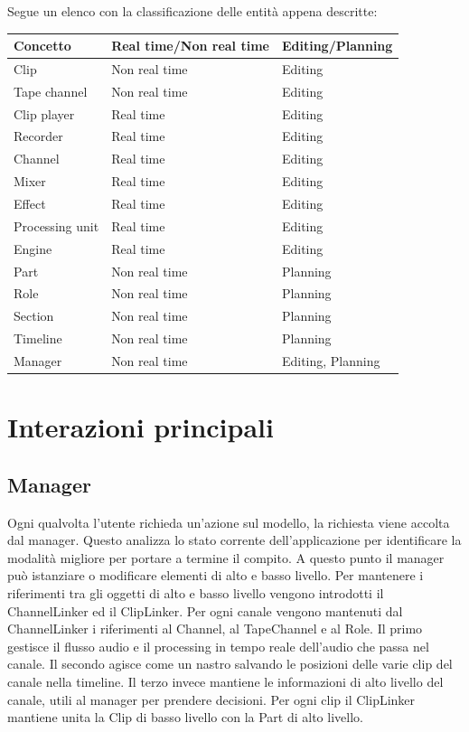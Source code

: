 \documentclass[a4paper,12pt]{report}
\begin{document}
Segue un elenco con la classificazione delle entità appena descritte:
\begin{center}
\begin{longtable}{| m{10em} | m{5cm} | m{4cm} |} 
 \hline
 Concetto & Real time/Non real time & Editing/Planning \\ [0.5ex] 
 \hline
 Clip & Non real time & Editing \\ 
 \hline
 Tape channel & Non real time & Editing \\
 \hline
 Clip player & Real time & Editing \\
 \hline
 Recorder & Real time & Editing \\
 \hline
 Channel & Real time & Editing \\ 
 \hline
 Mixer & Real time & Editing \\
 \hline 
 Effect & Real time & Editing \\
 \hline
 Processing unit & Real time & Editing \\
 \hline
 Engine & Real time & Editing \\
 \hline
 Part & Non real time & Planning \\
 \hline
 Role & Non real time & Planning \\
\hline
 Section & Non real time & Planning \\
\hline
 Timeline & Non real time & Planning \\
\hline
 Manager & Non real time & Editing, Planning \\
\hline
\end{longtable}
\end{center}

\section{Interazioni principali}
\subsection{Manager}
Ogni qualvolta l’utente richieda un’azione sul modello, la richiesta viene accolta dal manager. Questo analizza lo stato corrente dell’applicazione per identificare la modalità migliore per portare a termine il compito. A questo punto il manager può istanziare o modificare elementi di alto e basso livello.
Per mantenere i riferimenti tra gli oggetti di alto e basso livello vengono introdotti il ChannelLinker ed il ClipLinker. 
Per ogni canale vengono mantenuti dal ChannelLinker i riferimenti al Channel, al TapeChannel e al Role.
Il primo gestisce il flusso audio e il processing in tempo reale dell’audio che passa nel canale. Il secondo agisce come un nastro salvando le posizioni delle varie clip del canale nella timeline. Il terzo invece mantiene le informazioni di alto livello del canale, utili al manager per prendere decisioni.
Per ogni clip il ClipLinker mantiene unita la Clip di basso livello con la Part di alto livello.
\endsubsection
\end{document}
